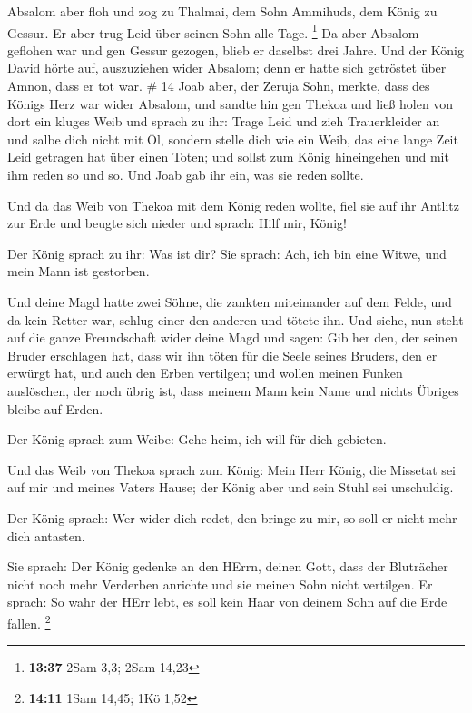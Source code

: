  Absalom aber floh und zog zu Thalmai, dem Sohn Ammihuds,
dem König zu Gessur. Er aber trug Leid über seinen Sohn alle Tage.
\footnote{\textbf{13:37} 2Sam 3,3; 2Sam 14,23}  Da aber
Absalom geflohen war und gen Gessur gezogen, blieb er daselbst drei
Jahre.  Und der König David hörte auf, auszuziehen wider
Absalom; denn er hatte sich getröstet über Amnon, dass er tot war. \# 14
 Joab aber, der Zeruja Sohn, merkte, dass des Königs Herz
war wider Absalom,  und sandte hin gen Thekoa und ließ holen
von dort ein kluges Weib und sprach zu ihr: Trage Leid und zieh
Trauerkleider an und salbe dich nicht mit Öl, sondern stelle dich wie
ein Weib, das eine lange Zeit Leid getragen hat über einen Toten;
 und sollst zum König hineingehen und mit ihm reden so und
so. Und Joab gab ihr ein, was sie reden sollte.

 Und da das Weib von Thekoa mit dem König reden wollte, fiel
sie auf ihr Antlitz zur Erde und beugte sich nieder und sprach: Hilf
mir, König!

 Der König sprach zu ihr: Was ist dir? Sie sprach: Ach, ich
bin eine Witwe, und mein Mann ist gestorben.

 Und deine Magd hatte zwei Söhne, die zankten miteinander
auf dem Felde, und da kein Retter war, schlug einer den anderen und
tötete ihn.  Und siehe, nun steht auf die ganze Freundschaft
wider deine Magd und sagen: Gib her den, der seinen Bruder erschlagen
hat, dass wir ihn töten für die Seele seines Bruders, den er erwürgt
hat, und auch den Erben vertilgen; und wollen meinen Funken auslöschen,
der noch übrig ist, dass meinem Mann kein Name und nichts Übriges bleibe
auf Erden.

 Der König sprach zum Weibe: Gehe heim, ich will für dich
gebieten.

 Und das Weib von Thekoa sprach zum König: Mein Herr König,
die Missetat sei auf mir und meines Vaters Hause; der König aber und
sein Stuhl sei unschuldig.

 Der König sprach: Wer wider dich redet, den bringe zu mir,
so soll er nicht mehr dich antasten.

 Sie sprach: Der König gedenke an den HErrn, deinen Gott,
dass der Bluträcher nicht noch mehr Verderben anrichte und sie meinen
Sohn nicht vertilgen. Er sprach: So wahr der HErr lebt, es soll kein
Haar von deinem Sohn auf die Erde fallen. \footnote{\textbf{14:11} 1Sam
  14,45; 1Kö 1,52}

